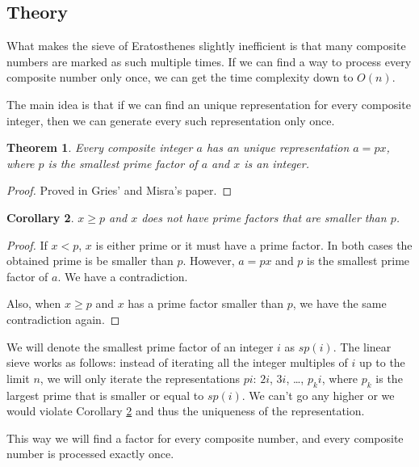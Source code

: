 \documentclass[12pt] {article}
\theoremstyle{plain}
\newtheorem{thm}{Theorem}[section]
\newtheorem{cor}[thm]{Corollary}
\theoremstyle{definition}
\begin{document}
\subsection {Theory}

What makes the sieve of Eratosthenes slightly inefficient is that many composite numbers are marked as such multiple times. If we can find a way to process every composite number only once, we can get the time complexity down to $O(n)$.

The main idea is that if we can find an unique representation for every composite integer, then we can generate every such representation only once.

\begin{thm}
\label {thm:comprepr}
Every composite integer $a$ has an unique representation $a = px$, where $p$ is the smallest prime factor of $a$ and $x$ is an integer.
\end{thm}

\begin{proof}
Proved in Gries' and Misra's paper\cite{gries}.
\end{proof}

\begin{cor}
\label {cor:pflimit}
$x \geq p$ and $x$ does not have prime factors that are smaller than $p$.
\end{cor}

\begin{proof}
If $x < p$, $x$ is either prime or it must have a prime factor. In both cases the obtained prime is be smaller than $p$. However, $a = px$ and $p$ is the smallest prime factor of $a$. We have a contradiction.

Also, when $x \geq p$ and $x$ has a prime factor smaller than $p$, we have the same contradiction again.
\end{proof}

We will denote the smallest prime factor of an integer $i$ as $sp(i)$. The linear sieve works as follows: instead of iterating all the integer multiples of $i$ up to the limit $n$, we will only iterate the representations $pi$: $2i$, $3i$, \dots , $p_ki$, where $p_k$ is the largest prime that is smaller or equal to $sp(i)$. We can't go any higher or we would violate Corollary \ref{cor:pflimit} and thus the uniqueness of the representation. 

This way we will find a factor for every composite number, and every composite number is processed exactly once.
\end{document}
